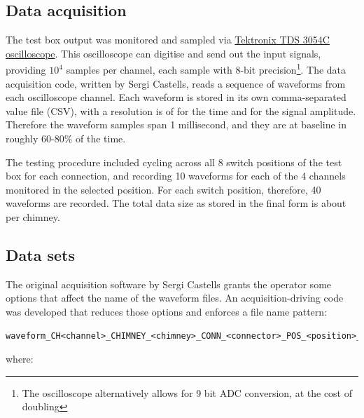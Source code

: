 \subsection{Data acquisition}
\label{ssec:DAQ}

The test box output was monitored and sampled via
\href{https://www.tek.com/datasheet/digital-phosphor-oscilloscopes-0}{Tektronix
TDS 3054C oscilloscope}. This oscilloscope can digitise and send out the
input signals, providing $10^4$ samples per channel, each sample with 8-bit
precision\footnote{The oscilloscope alternatively allows for 9 bit ADC
conversion, at the cost of doubling }.
The data acquisition code, written by Sergi Castells, reads a sequence of
waveforms from each oscilloscope channel. Each waveform is stored in its
own comma-separated value file (CSV), with a resolution is of  for
the time and  for the signal amplitude. Therefore the waveform
samples span 1 millisecond, and they are at baseline in roughly 60-80\%
of the time.

The testing procedure included cycling across all 8 switch positions of
the test box for each connection, and recording 10 waveforms for each of
the 4 channels monitored in the selected position. For each switch
position, therefore, 40 waveforms are recorded. The total data size as
stored in the final form is about  per chimney.

\subsection{Data sets}
\label{ssec:data-sets}

The original acquisition software by Sergi Castells grants the operator
some options that affect the name of the waveform files. An
acquisition-driving code was developed that reduces those options and
enforces a file name pattern:

\begin{verbatim}
waveform_CH<channel>_CHIMNEY_<chimney>_CONN_<connector>_POS_<position>_<index>.csv
\end{verbatim}

where:

